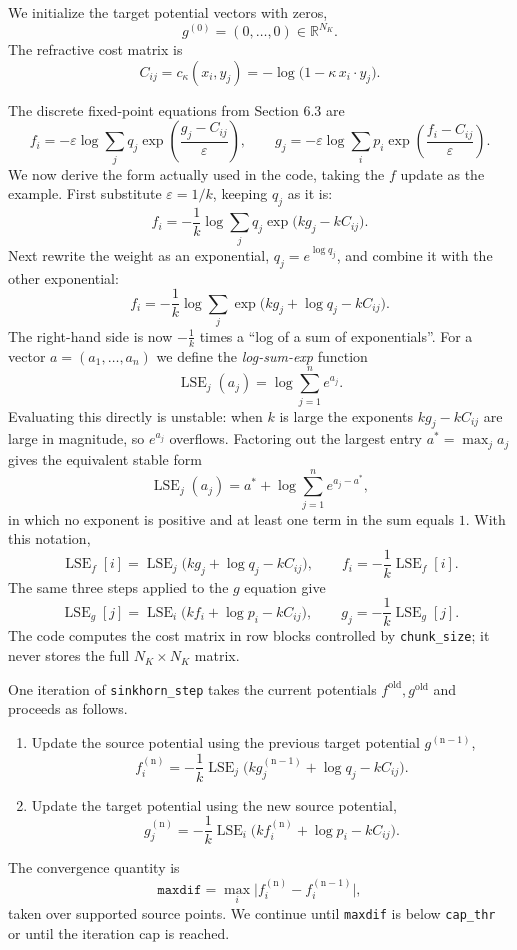 \documentclass{article}
\begin{document}
We initialize the target potential vectors with zeros,
\[
    g^{(0)}=(0,\ldots,0)\in\mathbb{R}^{N_K}.
\]
The refractive cost matrix is
\[
    C_{ij}=c_\kappa(x_i,y_j)
    =-\log\bigl(1-\kappa\,x_i\cdot y_j\bigr).
\]

The discrete fixed-point equations from Section 6.3 are
\[
    f_i=-\varepsilon\log\sum_j q_j
        \exp\!\left(\frac{g_j-C_{ij}}{\varepsilon}\right),
    \qquad
    g_j=-\varepsilon\log\sum_i p_i
        \exp\!\left(\frac{f_i-C_{ij}}{\varepsilon}\right).
\]
We now derive the form actually used in the code, taking the $f$ update as
the example.  First substitute $\varepsilon=1/k$, keeping $q_j$ as it is:
\[
    f_i=-\frac1k\log\sum_j q_j\exp\bigl(kg_j-kC_{ij}\bigr).
\]
Next rewrite the weight as an exponential, $q_j=e^{\log q_j}$, and combine it
with the other exponential:
\[
    f_i=-\frac1k\log\sum_j \exp\bigl(kg_j+\log q_j-kC_{ij}\bigr).
\]
The right-hand side is now $-\tfrac1k$ times a ``log of a sum of
exponentials''.  For a vector $a=(a_1,\ldots,a_n)$ we define the
\emph{log-sum-exp} function
\[
    \operatorname{LSE}_j(a_j)=\log\sum_{j=1}^{n}e^{a_j}.
\]
Evaluating this directly is unstable: when $k$ is large the exponents
$kg_j-kC_{ij}$ are large in magnitude, so $e^{a_j}$ overflows.
Factoring out the largest entry $a^*=\max_j a_j$ gives the equivalent stable
form
\[
    \operatorname{LSE}_j(a_j)=a^*+\log\sum_{j=1}^{n}e^{a_j-a^*},
\]
in which no exponent is positive and at least one term in the sum equals $1$.  With
this notation,
\[
    \operatorname{LSE}_f[i]=\operatorname{LSE}_j\bigl(kg_j+\log q_j-kC_{ij}\bigr),
    \qquad
    f_i=-\frac{1}{k}\operatorname{LSE}_f[i].
\]
The same three steps applied to the $g$ equation give
\[
    \operatorname{LSE}_g[j]=\operatorname{LSE}_i\bigl(kf_i+\log p_i-kC_{ij}\bigr),
    \qquad
    g_j=-\frac{1}{k}\operatorname{LSE}_g[j].
\]
The code computes the cost matrix in row blocks controlled by
\texttt{chunk\_size}; it never stores the full $N_K\times N_K$ matrix.

One iteration of \texttt{sinkhorn\_step} takes the current potentials
$f^{\mathrm{old}},g^{\mathrm{old}}$ and proceeds as follows.
\begin{enumerate}
    \item Update the source potential using the previous target potential $g^{\mathrm{(n-1)}}$,
    \[
        f^{\mathrm{(n)}}_i=-\frac1k\operatorname{LSE}_j\bigl(kg^{\mathrm{(n-1)}}_j+\log q_j-kC_{ij}\bigr).
    \]
    \item Update the target potential using the new source potential,
    \[
        g^{\mathrm{(n)}}_j=-\frac1k\operatorname{LSE}_i\bigl(kf^{\mathrm{(n)}}_i+\log p_i-kC_{ij}\bigr).
    \]

\end{enumerate}
The convergence quantity is
\[
    \texttt{maxdif}=\max_i\bigl|f^{\mathrm{(n)}}_i-f^{\mathrm{(n-1)}}_i\bigr|,
\]
taken over supported source points.  We continue until \texttt{maxdif} is
below \texttt{cap\_thr} or until the iteration cap is reached.
\end{document}

